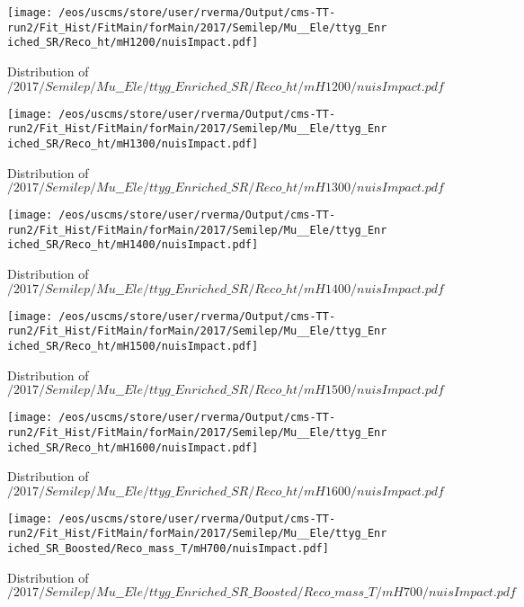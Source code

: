 \begin{figure}
\centering
\texttt{[image: /eos/uscms/store/user/rverma/Output/cms-TT-run2/Fit\_Hist/FitMain/forMain/2017/Semilep/Mu\_\_Ele/ttyg\_Enriched\_SR/Reco\_ht/mH1200/nuisImpact.pdf]}
\caption{Distribution of $/2017/Semilep/Mu\_\_Ele/ttyg\_Enriched\_SR/Reco\_ht/mH1200/nuisImpact.pdf$}
\end{figure}

\begin{figure}
\centering
\texttt{[image: /eos/uscms/store/user/rverma/Output/cms-TT-run2/Fit\_Hist/FitMain/forMain/2017/Semilep/Mu\_\_Ele/ttyg\_Enriched\_SR/Reco\_ht/mH1300/nuisImpact.pdf]}
\caption{Distribution of $/2017/Semilep/Mu\_\_Ele/ttyg\_Enriched\_SR/Reco\_ht/mH1300/nuisImpact.pdf$}
\end{figure}

\begin{figure}
\centering
\texttt{[image: /eos/uscms/store/user/rverma/Output/cms-TT-run2/Fit\_Hist/FitMain/forMain/2017/Semilep/Mu\_\_Ele/ttyg\_Enriched\_SR/Reco\_ht/mH1400/nuisImpact.pdf]}
\caption{Distribution of $/2017/Semilep/Mu\_\_Ele/ttyg\_Enriched\_SR/Reco\_ht/mH1400/nuisImpact.pdf$}
\end{figure}

\begin{figure}
\centering
\texttt{[image: /eos/uscms/store/user/rverma/Output/cms-TT-run2/Fit\_Hist/FitMain/forMain/2017/Semilep/Mu\_\_Ele/ttyg\_Enriched\_SR/Reco\_ht/mH1500/nuisImpact.pdf]}
\caption{Distribution of $/2017/Semilep/Mu\_\_Ele/ttyg\_Enriched\_SR/Reco\_ht/mH1500/nuisImpact.pdf$}
\end{figure}

\begin{figure}
\centering
\texttt{[image: /eos/uscms/store/user/rverma/Output/cms-TT-run2/Fit\_Hist/FitMain/forMain/2017/Semilep/Mu\_\_Ele/ttyg\_Enriched\_SR/Reco\_ht/mH1600/nuisImpact.pdf]}
\caption{Distribution of $/2017/Semilep/Mu\_\_Ele/ttyg\_Enriched\_SR/Reco\_ht/mH1600/nuisImpact.pdf$}
\end{figure}

\begin{figure}
\centering
\texttt{[image: /eos/uscms/store/user/rverma/Output/cms-TT-run2/Fit\_Hist/FitMain/forMain/2017/Semilep/Mu\_\_Ele/ttyg\_Enriched\_SR\_Boosted/Reco\_mass\_T/mH700/nuisImpact.pdf]}
\caption{Distribution of $/2017/Semilep/Mu\_\_Ele/ttyg\_Enriched\_SR\_Boosted/Reco\_mass\_T/mH700/nuisImpact.pdf$}
\end{figure}

